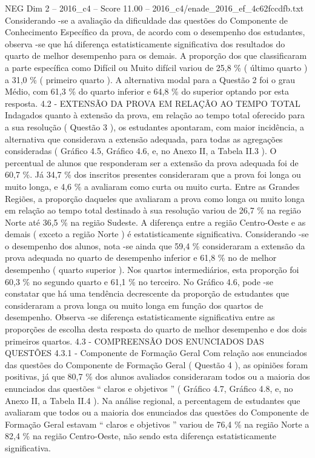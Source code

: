 \begin{textsample}{NEG Dim 2 – 2016\_c4 – Score 11.00 – 2016\_c4/enade\_2016\_ef\_4c62fccdfb.txt}
Considerando -se a avaliação da dificuldade das questões do Componente de Conhecimento Específico da prova, de acordo com o desempenho dos estudantes, observa -se que há diferença estatisticamente significativa dos resultados do quarto de melhor desempenho para os demais.
A proporção dos que classificaram a parte específica como Difícil ou Muito difícil variou de 25,8 \% ( último quarto ) a 31,0 \% ( primeiro quarto ).
A alternativa modal para a Questão 2 foi o grau Médio, com 61,3 \% do quarto inferior e 64,8 \% do superior optando por esta resposta. 4.2 - EXTENSÃO DA PROVA EM RELAÇÃO AO TEMPO TOTAL Indagados quanto à extensão da prova, em relação ao tempo total oferecido para a sua resolução ( Questão 3 ), os estudantes apontaram, com maior incidência, a alternativa que considerava a extensão adequada, para todas as agregações consideradas ( Gráfico 4.5, Gráfico 4.6, e, no Anexo II, a Tabela II.3 ).
O percentual de alunos que responderam ser a extensão da prova adequada foi de 60,7 \%.
Já 34,7 \% dos inscritos presentes consideraram que a prova foi longa ou muito longa, e 4,6 \% a avaliaram como curta ou muito curta.
Entre as Grandes Regiões, a proporção daqueles que avaliaram a prova como longa ou muito longa em relação ao tempo total destinado à sua resolução variou de 26,7 \% na região Norte até 36,5 \% na região Sudeste.
A diferença entre a região Centro-Oeste e as demais ( exceto a região Norte ) é estatisticamente significativa.
Considerando -se o desempenho dos alunos, nota -se ainda que 59,4 \% consideraram a extensão da prova adequada no quarto de desempenho inferior e 61,8 \% no de melhor desempenho ( quarto superior ).
Nos quartos intermediários, esta proporção foi 60,3 \% no segundo quarto e 61,1 \% no terceiro.
No Gráfico 4.6, pode -se constatar que há uma tendência decrescente da proporção de estudantes que consideraram a prova longa ou muito longa em função dos quartos de desempenho.
Observa -se diferença estatisticamente significativa entre as proporções de escolha desta resposta do quarto de melhor desempenho e dos dois primeiros quartos. 4.3 - COMPREENSÃO DOS ENUNCIADOS DAS QUESTÕES 4.3.1 - Componente de Formação Geral Com relação aos enunciados das questões do Componente de Formação Geral ( Questão 4 ), as opiniões foram positivas, já que 80,7 \% dos alunos avaliados consideraram todos ou a maioria dos enunciados das questões “ claros e objetivos ” ( Gráfico 4.7, Gráfico 4.8, e, no Anexo II, a Tabela II.4 ).
Na análise regional, a percentagem de estudantes que avaliaram que todos ou a maioria dos enunciados das questões do Componente de Formação Geral estavam “ claros e objetivos ” variou de 76,4 \% na região Norte a 82,4 \% na região Centro-Oeste, não sendo esta diferença estatisticamente significativa.

\end{textsample}
